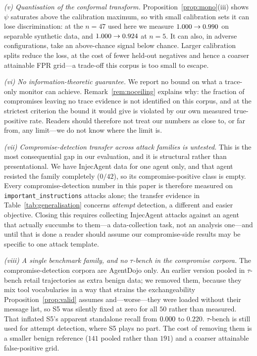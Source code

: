 \documentclass[preprint,12pt,authoryear]{elsarticle}
\theoremstyle{definition}
\begin{document}
\emph{(v) Quantisation of the conformal transform.}
Proposition~\ref{prop:mono}(iii) shows $\psi$ saturates above the calibration
maximum, so with small calibration sets it can lose discrimination: at the $n=47$
used here we measure $1.000 \to 0.990$ on separable synthetic data, and
$1.000 \to 0.924$ at $n=5$. It can also, in adverse configurations, take an above-chance signal below
chance. Larger calibration splits reduce the loss, at the cost of fewer held-out
negatives and hence a coarser attainable FPR grid---a trade-off this corpus is too
small to escape.

\emph{(vi) No information-theoretic guarantee.} We report no bound on what a
trace-only monitor can achieve. Remark~\ref{rem:noceiling} explains why: the
fraction of compromises leaving no trace evidence is not identified on this corpus,
and at the strictest criterion the bound it would give is violated by our own
measured true-positive rate. Readers should therefore not treat our numbers as
close to, or far from, any limit---we do not know where the limit is.

\emph{(vii) Compromise-detection transfer across attack families is untested.}
This is the most consequential gap in our evaluation, and it is structural rather
than presentational. We have InjecAgent data for one agent only, and that agent
resisted the family completely ($0/42$), so its compromise-positive class is empty.
Every compromise-detection number in this paper is therefore measured on
\texttt{important\_instructions} attacks alone; the transfer evidence in
Table~\ref{tab:generalisation} concerns \emph{attempt} detection, a different and
easier objective. Closing this requires collecting InjecAgent attacks against an
agent that actually succumbs to them---a data-collection task, not an analysis
one---and until that is done a reader should assume our compromise-side results may
be specific to one attack template.

\emph{(viii) A single benchmark family, and no $\tau$-bench in the compromise
corpora.} The compromise-detection corpora are AgentDojo only. An earlier version
pooled in $\tau$-bench retail trajectories as extra benign data; we removed them,
because they mix tool vocabularies in a way that strains the exchangeability
Proposition~\ref{prop:valid} assumes and---worse---they were loaded without their
message list, so S5 was silently fixed at zero for all $50$ rather than measured.
That inflated S5's apparent standalone recall from $0.000$ to $0.220$. $\tau$-bench
is still used for attempt detection, where S5 plays no part. The cost of removing
them is a smaller benign reference ($141$ pooled rather than $191$) and a coarser
attainable false-positive grid.
\end{document}
